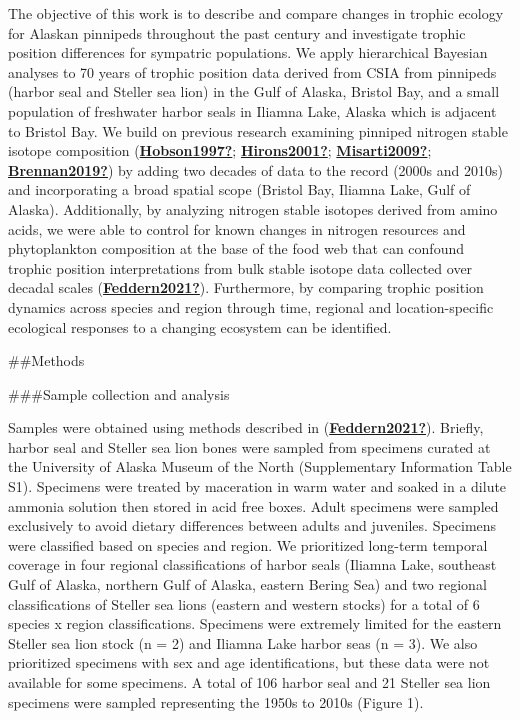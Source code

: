 \documentclass [11pt, proquest] {uwthesis}[2015/03/03]
\begin{document}
The objective of this work is to describe and compare changes in trophic ecology for Alaskan pinnipeds throughout the past century and investigate trophic position differences for sympatric populations. We apply hierarchical Bayesian analyses to 70 years of trophic position data derived from CSIA from pinnipeds (harbor seal and Steller sea lion) in the Gulf of Alaska, Bristol Bay, and a small population of freshwater harbor seals in Iliamna Lake, Alaska which is adjacent to Bristol Bay. We build on previous research examining pinniped nitrogen stable isotope composition (\protect\hyperlink{ref-Hobson1997}{\textbf{Hobson1997?}}; \protect\hyperlink{ref-Hirons2001}{\textbf{Hirons2001?}}; \protect\hyperlink{ref-Misarti2009}{\textbf{Misarti2009?}}; \protect\hyperlink{ref-Brennan2019}{\textbf{Brennan2019?}}) by adding two decades of data to the record (2000s and 2010s) and incorporating a broad spatial scope (Bristol Bay, Iliamna Lake, Gulf of Alaska). Additionally, by analyzing nitrogen stable isotopes derived from amino acids, we were able to control for known changes in nitrogen resources and phytoplankton composition at the base of the food web that can confound trophic position interpretations from bulk stable isotope data collected over decadal scales (\protect\hyperlink{ref-Feddern2021}{\textbf{Feddern2021?}}). Furthermore, by comparing trophic position dynamics across species and region through time, regional and location-specific ecological responses to a changing ecosystem can be identified.

\#\#Methods

\#\#\#Sample collection and analysis

Samples were obtained using methods described in (\protect\hyperlink{ref-Feddern2021}{\textbf{Feddern2021?}}). Briefly, harbor seal and Steller sea lion bones were sampled from specimens curated at the University of Alaska Museum of the North (Supplementary Information Table S1). Specimens were treated by maceration in warm water and soaked in a dilute ammonia solution then stored in acid free boxes. Adult specimens were sampled exclusively to avoid dietary differences between adults and juveniles. Specimens were classified based on species and region. We prioritized long-term temporal coverage in four regional classifications of harbor seals (Iliamna Lake, southeast Gulf of Alaska, northern Gulf of Alaska, eastern Bering Sea) and two regional classifications of Steller sea lions (eastern and western stocks) for a total of 6 species x region classifications. Specimens were extremely limited for the eastern Steller sea lion stock (n = 2) and Iliamna Lake harbor seas (n = 3). We also prioritized specimens with sex and age identifications, but these data were not available for some specimens. A total of 106 harbor seal and 21 Steller sea lion specimens were sampled representing the 1950s to 2010s (Figure 1).
\end{document}
